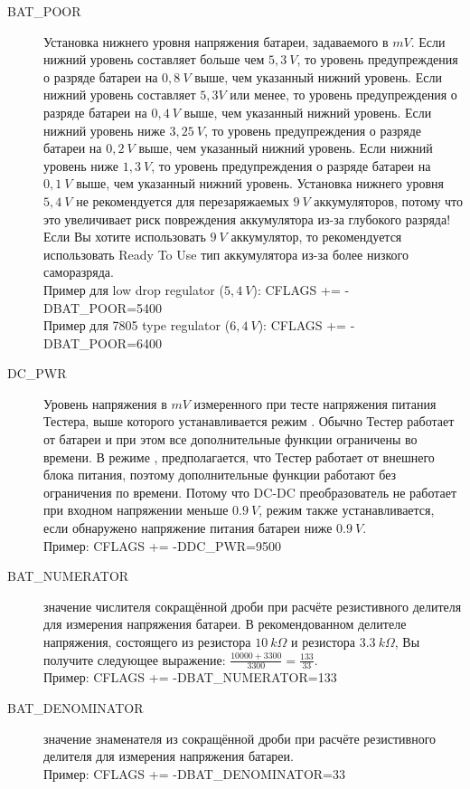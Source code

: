 \begin{description}
  \item[BAT\_POOR] Установка нижнего уровня напряжения батареи, задаваемого в \(mV\). 
Если нижний уровень составляет больше чем \(5,3~V\), то уровень предупреждения о разряде батареи на \(0,8~V\) выше, 
чем указанный нижний уровень. 
Если нижний уровень составляет \(5,3 V\) или менее, то уровень предупреждения о разряде батареи на \(0,4~V\) выше, 
чем указанный нижний уровень. 
Если нижний уровень ниже \(3,25~V\), то уровень предупреждения о разряде батареи на \(0,2~V\) выше, чем указанный 
нижний уровень. 
Если нижний уровень ниже \(1,3~V\), то уровень предупреждения о разряде батареи на \(0,1~V\) выше, чем указанный 
нижний уровень. 
Установка нижнего уровня \(5,4~V\) не рекомендуется для перезаряжаемых \(9~V\) аккумуляторов, потому что это 
увеличивает риск повреждения аккумулятора из-за глубокого разряда! Если Вы хотите использовать \(9~V\) аккумулятор, 
то рекомендуется использовать Ready To Use тип аккумулятора из-за более низкого саморазряда.\\
Пример для low drop regulator (\(5,4~V\)): CFLAGS += -DBAT\_POOR=5400\\
Пример для 7805 type regulator (\(6,4~V\)): CFLAGS += -DBAT\_POOR=6400

  \item[DC\_PWR] Уровень напряжения в \(mV\) измеренного при тесте напряжения питания Тестера, выше
  которого устанавливается режим . Обычно Тестер работает от батареи и при этом все 
дополнительные функции ограничены во времени. В режиме , предполагается, что Тестер работает 
от внешнего блока питания, поэтому дополнительные функции работают без ограничения по времени.
Потому что DC-DC преобразователь не работает при входном напряжении меньше \(0.9~V\),
режим  также устанавливается, если обнаружено напряжение питания батареи ниже \(0.9~V\). \\
Пример: CFLAGS += -DDC\_PWR=9500

  \item[BAT\_NUMERATOR] значение числителя сокращённой дроби при расчёте резистивного делителя для измерения напряжения 
батареи. В рекомендованном делителе напряжения, состоящего из резистора \(10~k\Omega\) и резистора \(3.3~k\Omega\), 
Вы получите следующее выражение: \(\frac{ 10000 + 3300}{ 3300} = \frac{ 133}{ 33}\). \\
Пример: CFLAGS += -DBAT\_NUMERATOR=133

  \item[BAT\_DENOMINATOR] значение знаменателя из сокращённой дроби при расчёте резистивного делителя 
для измерения напряжения батареи. \\
Пример: CFLAGS += -DBAT\_DENOMINATOR=33


\end{description}
